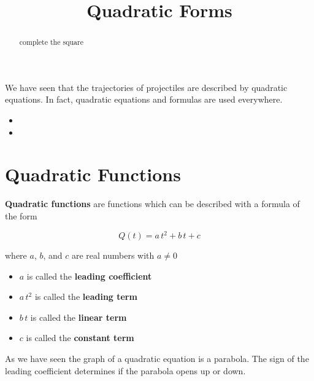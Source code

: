 \documentclass{ximera}
\title{Quadratic Forms}
\begin{document}
\begin{abstract}
complete the square
\end{abstract}
\maketitle



We have seen that the trajectories of projectiles are described by quadratic equations.  In fact, quadratic equations and formulas are used everywhere.


\begin{itemize}
\item {}
\item {}
\end{itemize}







\section{Quadratic Functions}


\begin{definition}
\textbf{Quadratic functions} are functions which can be described with a formula of the form

\[  Q(t) = a \, t^2 + b \, t + c  \]

where $a$, $b$, and $c$ are real numbers with $a \ne 0$



\begin{itemize}
\item $a$ is called the \textbf{leading coefficient} 
\item $a \, t^2$ is called the \textbf{leading term} 
\item $b \, t$ is called the \textbf{linear term} 
\item $c$ is called the \textbf{constant term} 
\end{itemize}

\end{definition}




As we have seen the graph of a quadratic equation is a parabola. The sign of the leading coefficient determines if the parabola opens up or down.
\end{document}

